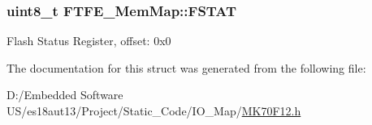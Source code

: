\subsubsection[{F\+S\+T\+A\+T}]{\setlength{\rightskip}{0pt plus 5cm}uint8\+\_\+t F\+T\+F\+E\+\_\+\+Mem\+Map\+::\+F\+S\+T\+A\+T}\label{struct_f_t_f_e___mem_map_a7e8a4e06df758e3dc251260d71818be8}
Flash Status Register, offset\+: 0x0 

The documentation for this struct was generated from the following file\+:\begin{DoxyCompactItemize}
\item 
D\+:/\+Embedded Software U\+S/es18aut13/\+Project/\+Static\+\_\+\+Code/\+I\+O\+\_\+\+Map/\hyperlink{_m_k70_f12_8h}{M\+K70\+F12.\+h}\end{DoxyCompactItemize}
